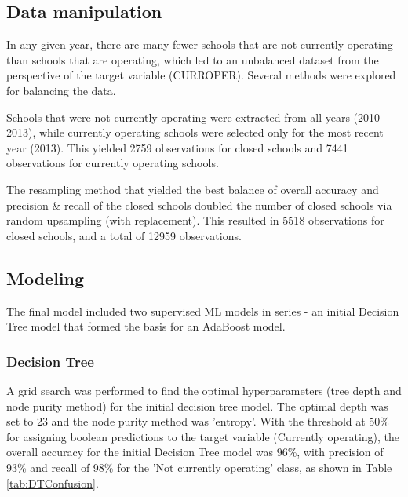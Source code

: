 \documentclass[11pt, letterpaper]{article}
\begin{document}
\subsection{Data manipulation}
In any given year, there are many fewer schools that are not currently operating than schools that are operating, which led to an unbalanced dataset from the perspective of the target variable (CURROPER). Several methods were explored for balancing the data.

Schools that were not currently operating were extracted from all years (2010 - 2013), while currently operating schools were selected only for the most recent year (2013). This yielded 2759 observations for closed schools and 7441 observations for currently operating schools.

The resampling method that yielded the best balance of overall accuracy and precision \& recall of the closed schools doubled the number of closed schools via random upsampling (with replacement). This resulted in 5518 observations for closed schools, and a total of 12959 observations.

\subsection{Modeling}
The final model included two supervised ML models in series - an initial Decision Tree model that formed the basis for an AdaBoost model. 

 \subsubsection{Decision Tree}
A grid search was performed to find the optimal hyperparameters (tree depth and node purity method) for the initial decision tree model. The optimal depth was set to 23 and the node purity method was 'entropy'. With the  threshold at 50\% for assigning boolean predictions to the target variable (Currently operating), the overall accuracy for the initial Decision Tree model was 96\%, with precision of 93\% and recall of 98\% for the 'Not currently operating' class, as shown in Table \ref{tab:DTConfusion}.
   
\end{document}
